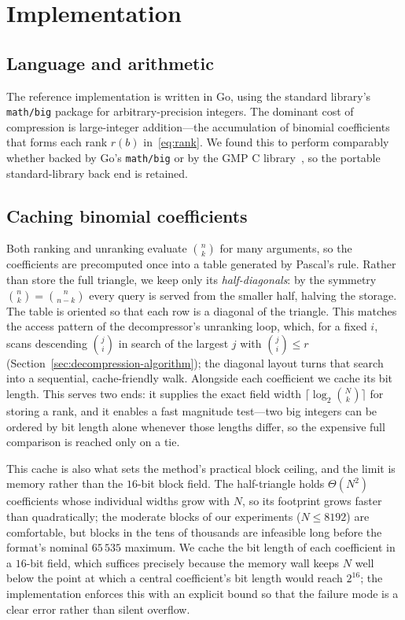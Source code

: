 \documentclass[entropy,article,submit,oneauthor,pdftex]{Definitions/mdpi}
\begin{document}
\section{Implementation}\label{sec:implementation}
\subsection{Language and arithmetic}
The reference implementation is written in Go, using the standard library's
\texttt{math/big} package for arbitrary-precision integers. The dominant cost of
compression is large-integer addition---the accumulation of binomial
coefficients that forms each rank $r(b)$ in~\eqref{eq:rank}. We found this to
perform comparably whether backed by Go's \texttt{math/big} or by the GMP C
library~\cite{Granlund16}, so the portable standard-library back end is retained.

\subsection{Caching binomial coefficients}
Both ranking and unranking evaluate $\binom{n}{k}$ for many arguments, so the
coefficients are precomputed once into a table generated by Pascal's rule.
Rather than store the full
triangle, we keep only its \emph{half-diagonals}: by the symmetry
$\binom{n}{k}=\binom{n}{n-k}$ every query is served from the smaller half,
halving the storage. The table is oriented so that each row is a diagonal of the
triangle. This matches the access pattern of the decompressor's unranking loop,
which, for a fixed $i$, scans descending $\binom{j}{i}$ in search of the largest
$j$ with $\binom{j}{i}\leqslant r$ (Section~\ref{sec:decompression-algorithm});
the diagonal layout turns that search into a sequential, cache-friendly walk.
Alongside each coefficient we cache its bit length. This serves two ends: it
supplies the exact field width $\lceil\log_2\binom{N}{k}\rceil$ for storing a
rank, and it enables a fast magnitude test---two big integers can be ordered by
bit length alone whenever those lengths differ, so the expensive full comparison
is reached only on a tie.

This cache is also what sets the method's practical block ceiling, and the limit
is memory rather than the $16$-bit block field. The half-triangle holds
$\Theta(N^{2})$ coefficients whose individual widths grow with $N$, so its
footprint grows faster than quadratically; the moderate blocks of our
experiments ($N\le 8192$) are comfortable, but blocks in the tens of thousands
are infeasible long before the format's nominal $65\,535$ maximum. We cache the bit
length of each coefficient in a $16$-bit field, which suffices precisely because
the memory wall keeps $N$ well below the point at which a central coefficient's
bit length would reach $2^{16}$; the implementation enforces this with an
explicit bound so that the failure mode is a clear error rather than silent
overflow.
\end{document}

